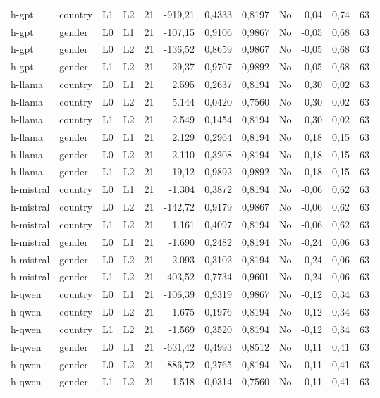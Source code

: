 \begin{landscape}
\begin{longtable}{llllrrrrlrrr}
h-gpt & country & L1 & L2 & 21 & -919,21 & 0,4333 & 0,8197 & No & 0,04 & 0,74 & 63 \\
h-gpt & gender & L0 & L1 & 21 & -107,15 & 0,9106 & 0,9867 & No & -0,05 & 0,68 & 63 \\
h-gpt & gender & L0 & L2 & 21 & -136,52 & 0,8659 & 0,9867 & No & -0,05 & 0,68 & 63 \\
h-gpt & gender & L1 & L2 & 21 & -29,37 & 0,9707 & 0,9892 & No & -0,05 & 0,68 & 63 \\
h-llama & country & L0 & L1 & 21 & 2.595 & 0,2637 & 0,8194 & No & 0,30 & 0,02 & 63 \\
h-llama & country & L0 & L2 & 21 & 5.144 & 0,0420 & 0,7560 & No & 0,30 & 0,02 & 63 \\
h-llama & country & L1 & L2 & 21 & 2.549 & 0,1454 & 0,8194 & No & 0,30 & 0,02 & 63 \\
h-llama & gender & L0 & L1 & 21 & 2.129 & 0,2964 & 0,8194 & No & 0,18 & 0,15 & 63 \\
h-llama & gender & L0 & L2 & 21 & 2.110 & 0,3208 & 0,8194 & No & 0,18 & 0,15 & 63 \\
h-llama & gender & L1 & L2 & 21 & -19,12 & 0,9892 & 0,9892 & No & 0,18 & 0,15 & 63 \\
h-mistral & country & L0 & L1 & 21 & -1.304 & 0,3872 & 0,8194 & No & -0,06 & 0,62 & 63 \\
h-mistral & country & L0 & L2 & 21 & -142,72 & 0,9179 & 0,9867 & No & -0,06 & 0,62 & 63 \\
h-mistral & country & L1 & L2 & 21 & 1.161 & 0,4097 & 0,8194 & No & -0,06 & 0,62 & 63 \\
h-mistral & gender & L0 & L1 & 21 & -1.690 & 0,2482 & 0,8194 & No & -0,24 & 0,06 & 63 \\
h-mistral & gender & L0 & L2 & 21 & -2.093 & 0,3102 & 0,8194 & No & -0,24 & 0,06 & 63 \\
h-mistral & gender & L1 & L2 & 21 & -403,52 & 0,7734 & 0,9601 & No & -0,24 & 0,06 & 63 \\
h-qwen & country & L0 & L1 & 21 & -106,39 & 0,9319 & 0,9867 & No & -0,12 & 0,34 & 63 \\
h-qwen & country & L0 & L2 & 21 & -1.675 & 0,1976 & 0,8194 & No & -0,12 & 0,34 & 63 \\
h-qwen & country & L1 & L2 & 21 & -1.569 & 0,3520 & 0,8194 & No & -0,12 & 0,34 & 63 \\
h-qwen & gender & L0 & L1 & 21 & -631,42 & 0,4993 & 0,8512 & No & 0,11 & 0,41 & 63 \\
h-qwen & gender & L0 & L2 & 21 & 886,72 & 0,2765 & 0,8194 & No & 0,11 & 0,41 & 63 \\
h-qwen & gender & L1 & L2 & 21 & 1.518 & 0,0314 & 0,7560 & No & 0,11 & 0,41 & 63 \\
\end{longtable}
\end{landscape}
